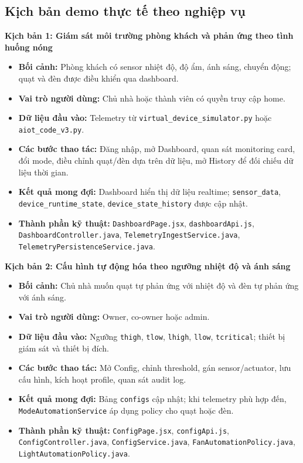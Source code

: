 \subsection{Kịch bản demo thực tế theo nghiệp vụ}

\textbf{Kịch bản 1: Giám sát môi trường phòng khách và phản ứng theo tình huống nóng}
\begin{itemize}
    \item \textbf{Bối cảnh:} Phòng khách có sensor nhiệt độ, độ ẩm, ánh sáng, chuyển động; quạt và đèn được điều khiển qua dashboard.
    \item \textbf{Vai trò người dùng:} Chủ nhà hoặc thành viên có quyền truy cập home.
    \item \textbf{Dữ liệu đầu vào:} Telemetry từ \texttt{virtual\_device\_simulator.py} hoặc \texttt{aiot\_code\_v3.py}.
    \item \textbf{Các bước thao tác:} Đăng nhập, mở Dashboard, quan sát monitoring card, đổi mode, điều chỉnh quạt/đèn dựa trên dữ liệu, mở History để đối chiếu dữ liệu thời gian.
    \item \textbf{Kết quả mong đợi:} Dashboard hiển thị dữ liệu realtime; \texttt{sensor\_data}, \texttt{device\_runtime\_state}, \texttt{device\_state\_history} được cập nhật.
    \item \textbf{Thành phần kỹ thuật:} \texttt{DashboardPage.jsx}, \texttt{dashboardApi.js}, \texttt{DashboardController.java}, \texttt{TelemetryIngestService.java}, \texttt{TelemetryPersistenceService.java}.
\end{itemize}

\textbf{Kịch bản 2: Cấu hình tự động hóa theo ngưỡng nhiệt độ và ánh sáng}
\begin{itemize}
    \item \textbf{Bối cảnh:} Chủ nhà muốn quạt tự phản ứng với nhiệt độ và đèn tự phản ứng với ánh sáng.
    \item \textbf{Vai trò người dùng:} Owner, co-owner hoặc admin.
    \item \textbf{Dữ liệu đầu vào:} Ngưỡng \texttt{thigh}, \texttt{tlow}, \texttt{lhigh}, \texttt{llow}, \texttt{tcritical}; thiết bị giám sát và thiết bị đích.
    \item \textbf{Các bước thao tác:} Mở Config, chỉnh threshold, gán sensor/actuator, lưu cấu hình, kích hoạt profile, quan sát audit log.
    \item \textbf{Kết quả mong đợi:} Bảng \texttt{configs} cập nhật; khi telemetry phù hợp đến, \texttt{ModeAutomationService} áp dụng policy cho quạt hoặc đèn.
    \item \textbf{Thành phần kỹ thuật:} \texttt{ConfigPage.jsx}, \texttt{configApi.js}, \texttt{ConfigController.java}, \texttt{ConfigService.java}, \texttt{FanAutomationPolicy.java}, \texttt{LightAutomationPolicy.java}.
\end{itemize}


